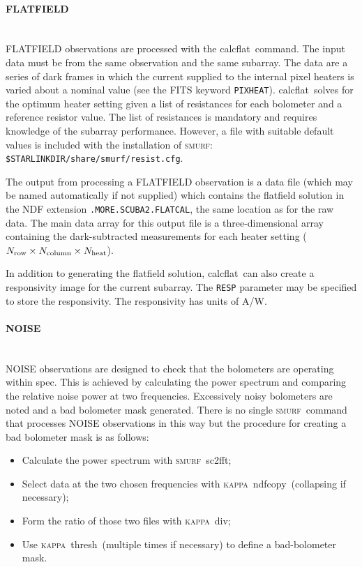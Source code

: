 \documentclass[twoside,11pt]{article}
\newcommand{\xref}[3]{#1}
\newcommand{\xlabel}[1]{}
\renewcommand{\_}{\texttt{\symbol{95}}}
\newcommand{\KAPPA}{\textsc{kappa}}
\newcommand{\SMURF}{\textsc{smurf}}
\newcommand{\task}[1]{\textsf{#1}}
\newcommand{\calcflat}{\xref{\task{calcflat}}{sun258}{CALCFLAT}}
\newcommand{\fft}{\xref{\task{sc2fft}}{sun258}{SC2FFT}}
\newcommand{\kapdiv}{\xref{\task{div}}{sun95}{DIV}}
\newcommand{\ndfcopy}{\xref{\task{ndfcopy}}{sun95}{NDFCOPY}}
\newcommand{\thresh}{\xref{\task{thresh}}{sun95}{THRESH}}
\newcommand{\aparam}[1]{\texttt{#1}}     %
\begin{document}
\paragraph{\xlabel{flatcal}FLATFIELD\label{se:flatcal}} \ \\

FLATFIELD observations are processed with the \calcflat\ command. The
input data must be from the same observation and the same
subarray. The data are a series of dark frames in which the current
supplied to the internal pixel heaters is varied about a nominal value
(see the FITS keyword \texttt{PIXHEAT}). \calcflat\ solves for the
optimum heater setting given a list of resistances for each bolometer
and a reference resistor value. The list of resistances is mandatory
and requires knowledge of the subarray performance. However, a file
with suitable default values is included with the installation of
\SMURF: \texttt{\$STARLINK\_DIR/share/smurf/resist.cfg}.

The output from processing a FLATFIELD observation is a data file
(which may be named automatically if not supplied) which contains the
flatfield solution in the NDF extension \texttt{.MORE.SCUBA2.FLATCAL},
the same location as for the raw data. The main data array for this
output file is a three-dimensional array containing the
dark-subtracted measurements for each heater setting ($N_{\rm
  row}\times N_{\rm column} \times N_{\rm heat}$).

In addition to generating the flatfield solution, \calcflat\ can also
create a responsivity image for the current subarray. The
\aparam{RESP} parameter may be specified to store the
responsivity. The responsivity has units of A/W.

\paragraph{NOISE} \ \\

NOISE observations are designed to check that the bolometers are
operating within spec. This is achieved by calculating the power
spectrum and comparing the relative noise power at two frequencies.
Excessively noisy bolometers are noted and a bad bolometer mask
generated. There is no single \SMURF\ command that processes NOISE
observations in this way but the procedure for creating a bad
bolometer mask is as follows:
\begin{itemize}
\item Calculate the power spectrum with \SMURF\ \fft;
\item Select data at the two chosen frequencies with \KAPPA\ \ndfcopy\
  (collapsing if necessary);
\item Form the ratio of those two files with \KAPPA\ \kapdiv;
\item Use \KAPPA\ \thresh\ (multiple times if necessary) to define a
  bad-bolometer mask.
\end{itemize}
\end{document}
